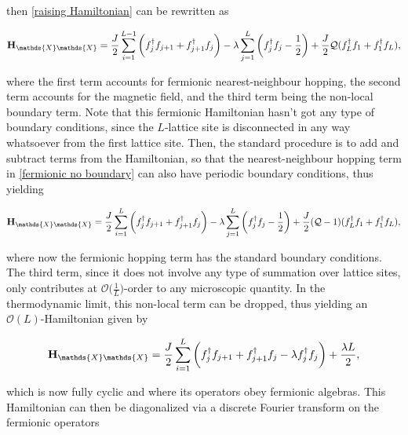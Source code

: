 \documentclass{homework}
\begin{document}
then \eqref{raising Hamiltonian} can be rewritten as 

\begin{equation}
    {\bf H}_{\mathds{X}\mathds{X}} = \frac{J}{2} \sum_{i=1}^{L-1} \bigg(f_{j}^{\dagger} f_{j+1} + f_{j+1}^{\dagger} f_j\bigg) - \lambda \sum_{j=1}^{L} \bigg(f_{j}^{\dagger} f_{j} - \frac{1}{2}\bigg) + \frac{J}{2} \mathcal{Q} (f_L^\dagger f_1 + f_1^\dagger f_L),
    \label{fermionic no boundary}
\end{equation}

where the first term accounts for fermionic nearest-neighbour hopping, the second term accounts for the magnetic field, and the third term being the non-local boundary term. Note that this fermionic Hamiltonian hasn't got any type of boundary conditions, since the $L$-lattice site is disconnected in any way whatsoever from the first lattice site. Then, the standard procedure is to add and subtract terms from the Hamiltonian, so that the nearest-neighbour hopping term in \eqref{fermionic no boundary} can also have periodic boundary conditions, thus yielding 

\begin{equation}
    {\bf H}_{\mathds{X}\mathds{X}}  = \frac{J}{2} \sum_{i=1}^{L} \bigg(f_{j}^{\dagger} f_{j+1} + f_{j+1}^{\dagger} f_j\bigg) - \lambda \sum_{j=1}^{L} \bigg(f_{j}^{\dagger} f_{j} - \frac{1}{2}\bigg) + \frac{J}{2} (\mathcal{Q}-1) (f_L^\dagger f_1 + f_1^\dagger f_L),
    \label{true fermionic hamiltonian}
\end{equation}

where now the fermionic hopping term has the standard boundary conditions. The third term, since it does not involve any type of summation over lattice sites, only contributes at $\mathcal{O}\bigg(\frac{1}{L}\bigg)$-order to any microscopic quantity. In the thermodynamic limit, this non-local term can be dropped, thus yielding an $\mathcal{O}(L)$-Hamiltonian given by 

\begin{equation}
    {\bf H}_{\mathds{X}\mathds{X}}  = \frac{J}{2} \sum_{i=1}^{L} \bigg(f_{j}^{\dagger} f_{j+1} + f_{j+1}^{\dagger} f_j - \lambda f_{j}^{\dagger} f_{j}\bigg) + \frac{\lambda L}{2},
    \label{L-order fermionic hamiltonian}
\end{equation}

which is now fully cyclic and where its operators obey fermionic algebras. This Hamiltonian can then be diagonalized via a discrete Fourier transform on the fermionic operators 
\end{document}
